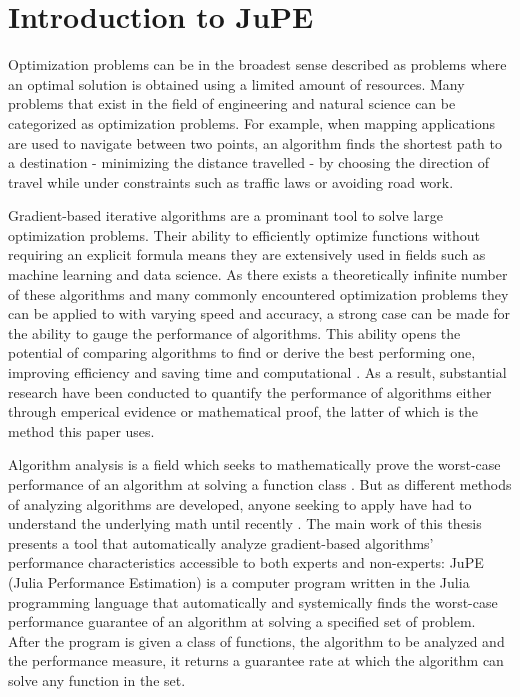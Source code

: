 \chapter{Introduction to JuPE}

Optimization problems can be in the broadest sense described as problems where an optimal solution is obtained using a limited amount of resources. Many problems that exist in the field of engineering and natural science can be categorized as optimization problems. For example, when mapping applications are used to navigate between two points, an algorithm finds the shortest path to a destination -  minimizing the distance travelled - by choosing the direction of travel while under constraints such as traffic laws or avoiding road work.

Gradient-based iterative algorithms are a prominant tool to solve large optimization problems. Their ability to efficiently optimize functions without requiring an explicit formula means they are extensively used in fields such as machine learning and data science. As there exists a theoretically infinite number of these algorithms and many commonly encountered optimization problems they can be applied to with varying speed and accuracy, a strong case can be made for the ability to gauge the performance of algorithms. This ability opens the potential of comparing algorithms to find or derive the best performing one, improving efficiency and saving time and computational . As a result, substantial research have  been conducted to quantify the performance of algorithms either through emperical evidence or mathematical proof, the latter of which is the method this paper  uses.

Algorithm analysis is a field which seeks to mathematically prove the worst-case performance of an algorithm at solving a function class . But as different methods of analyzing algorithms are developed, anyone seeking to apply have had to understand the underlying math until recently \cite{pepit}. The main work of this thesis presents a tool that automatically analyze gradient-based algorithms' performance characteristics accessible to both experts and non-experts: JuPE (Julia Performance Estimation) is a computer program written in the Julia programming language that automatically and systemically finds the worst-case performance guarantee of an algorithm at solving a specified set of problem. After the program is given a class of functions, the algorithm to be analyzed and the performance measure, it returns a guarantee rate at which the algorithm can solve any function in the set.

